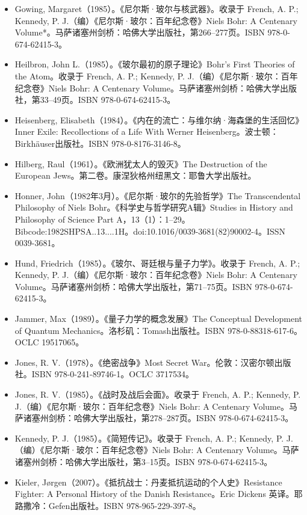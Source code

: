 \begin{itemize}
\item Gowing, Margaret（1985）。《尼尔斯·玻尔与核武器》。收录于 French, A. P.; Kennedy, P. J.（编）《尼尔斯·玻尔：百年纪念卷》Niels Bohr: A Centenary Volume*。马萨诸塞州剑桥：哈佛大学出版社，第266–277页。ISBN 978-0-674-62415-3。
\item Heilbron, John L.（1985）。《玻尔最初的原子理论》Bohr's First Theories of the Atom。收录于 French, A. P.; Kennedy, P. J.（编）《尼尔斯·玻尔：百年纪念卷》Niels Bohr: A Centenary Volume。马萨诸塞州剑桥：哈佛大学出版社，第33–49页。ISBN 978-0-674-62415-3。
\item Heisenberg, Elisabeth（1984）。《内在的流亡：与维尔纳·海森堡的生活回忆》Inner Exile: Recollections of a Life With Werner Heisenberg。波士顿：Birkhäuser出版社。ISBN 978-0-8176-3146-8。
\item Hilberg, Raul（1961）。《欧洲犹太人的毁灭》The Destruction of the European Jews。第二卷。康涅狄格州纽黑文：耶鲁大学出版社。
\item Honner, John（1982年3月）。《尼尔斯·玻尔的先验哲学》The Transcendental Philosophy of Niels Bohr。《科学史与哲学研究A辑》Studies in History and Philosophy of Science Part A，13（1）：1–29。Bibcode:1982SHPSA..13....1H。doi:10.1016/0039-3681(82)90002-4。ISSN 0039-3681。
\item Hund, Friedrich（1985）。《玻尔、哥廷根与量子力学》。收录于 French, A. P.; Kennedy, P. J.（编）《尼尔斯·玻尔：百年纪念卷》Niels Bohr: A Centenary Volume。马萨诸塞州剑桥：哈佛大学出版社，第71–75页。ISBN 978-0-674-62415-3。
\item Jammer, Max（1989）。《量子力学的概念发展》The Conceptual Development of Quantum Mechanics。洛杉矶：Tomash出版社。ISBN 978-0-88318-617-6。OCLC 19517065。
\item Jones, R. V.（1978）。《绝密战争》Most Secret War。伦敦：汉密尔顿出版社。ISBN 978-0-241-89746-1。OCLC 3717534。
\item Jones, R. V.（1985）。《战时及战后会面》。收录于 French, A. P.; Kennedy, P. J.（编）《尼尔斯·玻尔：百年纪念卷》Niels Bohr: A Centenary Volume。马萨诸塞州剑桥：哈佛大学出版社，第278–287页。ISBN 978-0-674-62415-3。
\item Kennedy, P. J.（1985）。《简短传记》。收录于 French, A. P.; Kennedy, P. J.（编）《尼尔斯·玻尔：百年纪念卷》Niels Bohr: A Centenary Volume。马萨诸塞州剑桥：哈佛大学出版社，第3–15页。ISBN 978-0-674-62415-3。
\item Kieler, Jørgen（2007）。《抵抗战士：丹麦抵抗运动的个人史》Resistance Fighter: A Personal History of the Danish Resistance。Eric Dickens 英译。耶路撒冷：Gefen出版社。ISBN 978-965-229-397-8。

\end{itemize}
